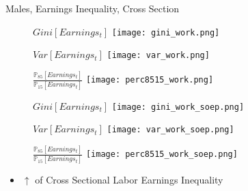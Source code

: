 \documentclass{beamer}
\begin{document}
\begin{frame}{Males, Earnings Inequality, Cross Section}
\begin{figure}[!t]
\centering
\begin{minipage}[b]{0.32\textwidth}{$Gini[Earnings_t]$}
\centering
\texttt{[image: gini\_work.png]}
\end{minipage}
\begin{minipage}[b]{0.32\textwidth}{$Var[Earnings_t]$}
\centering
\texttt{[image: var\_work.png]}
\end{minipage}
\begin{minipage}[b]{0.32\textwidth}{$\frac{\mathbb{P}_{85}[Earnings_t]}{\mathbb{P}_{15}[Earnings_t]}$}
\centering
\texttt{[image: perc8515\_work.png]}
\end{minipage}
\end{figure}
\begin{figure}[!t]
\centering
\begin{minipage}[b]{0.32\textwidth}{$Gini[Earnings_t]$}
\centering
\texttt{[image: gini\_work\_soep.png]}
\end{minipage}
\begin{minipage}[b]{0.32\textwidth}{$Var[Earnings_t]$}
\centering
\texttt{[image: var\_work\_soep.png]}
\end{minipage}
\begin{minipage}[b]{0.32\textwidth}{$\frac{\mathbb{P}_{85}[Earnings_t]}{\mathbb{P}_{15}[Earnings_t]}$}
\centering
\texttt{[image: perc8515\_work\_soep.png]}
\end{minipage}
\end{figure}
\begin{itemize}
\setlength{\itemsep}{0.7 cm}
\item $\uparrow$ of Cross Sectional Labor Earnings Inequality
\end{itemize}
\end{frame}
\end{document}
